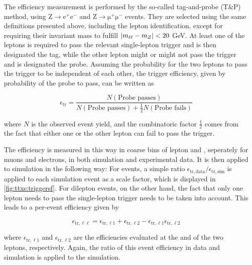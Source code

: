 The efficiency measurement is performed by the so-called tag-and-probe (T\&P) method, using $\mathrm{Z} \rightarrow \mathrm{e^+ e^-}$ and $\mathrm{Z} \rightarrow \mathrm{\mu^+ \mu^-}$ events. They are selected using the same definitions presented above, including the lepton identification, except for requiring their invariant mass to fulfill $| m_{\ell\ell} - m_Z | < 20$ GeV. At least one of the leptons is required to pass the relevant single-lepton trigger and is then designated the tag, while the other lepton might or might not pass the trigger and is designated the probe. Assuming the probability for the two leptons to pass the trigger to be independent of each other, the trigger efficiency, given by probability of the probe to pass, can be written as

\begin{equation}
    \epsilon_{\mathrm{tr}} = \frac{N (\text{Probe passes})}{ N (\text{Probe passes}) + \frac{1}{2} N (\text{Probe fails}) }
\end{equation}

where $N$ is the observed event yield, and the combinatoric factor $\frac{1}{2}$ comes from the fact that either one or the other lepton can fail to pass the trigger. 

The efficiency is measured in this way in coarse bins of lepton \pt and \abseta, seperately for muons and electrons, in both simulation and experimental data. It is then applied to simulation in the following way: For \ljets events, a simple ratio $\epsilon_{\mathrm{tr,data}} / \epsilon_{\mathrm{tr,sim}}$ is applied to each simulation event as a scale factor, which is displayed in \cref{fig:ttxs:triggersf}. For dilepton events, on the other hand, the fact that only one lepton needs to pass the single-lepton trigger needs to be taken into account. This leads to a per-event efficiency given by

\begin{equation}
\label{eq:ttxs:triggersf}
    \epsilon_{\mathrm{tr,\ell \ell}} = \epsilon_{\mathrm{tr,\ell 1}} + \epsilon_{\mathrm{tr,\ell 2}} - \epsilon_{\mathrm{tr,\ell 1}} \epsilon_{\mathrm{tr,\ell 2}}
\end{equation}

where $\epsilon_{\mathrm{tr,\ell 1}}$ and $\epsilon_{\mathrm{tr,\ell 2}}$ are the efficiencies evaluated at the \pt and \abseta of the two leptons, respectively. Again, the ratio of this event efficiency in data and simulation is applied to the simulation.

